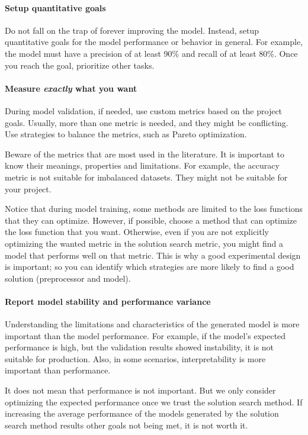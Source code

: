 \paragraph{Setup quantitative goals}

Do not fall on the trap of forever improving the model. Instead, setup quantitative goals
for the model performance or behavior in general.  For example, the model must have a
precision of at least 90\% and recall of at least 80\%.  Once you reach the goal,
prioritize other tasks.

\paragraph{Measure \emph{exactly} what you want}

During model validation, if needed, use custom metrics based on the project goals.
Usually, more than one metric is needed, and they might be conflicting.  Use strategies to
balance the metrics, such as Pareto optimization.

Beware of the metrics that are most used in the literature.  It is important to know their
meanings, properties and limitations.  For example, the accuracy metric is not suitable
for imbalanced datasets.  They might not be suitable for your project.

Notice that during model training, some methods are limited to the loss functions that
they can optimize.  However, if possible, choose a method that can optimize the loss
function that you want.  Otherwise, even if you are not explicitly optimizing the wanted
metric in the solution search metric, you might find a model that performs well on that
metric.  This is why a good experimental design is important; so you can identify which
strategies are more likely to find a good solution (preprocessor and model).

\paragraph{Report model stability and performance variance}

Understanding the limitations and characteristics of the generated model is more important
than the model performance.  For example, if the model's expected performance is high, but
the validation results showed instability, it is not suitable for production.  Also, in
some scenarios, interpretability is more important than performance.

It does not mean that performance is not important.  But we only consider optimizing the
expected performance once we trust the solution search method.  If increasing the average
performance of the models generated by the solution search method results other goals not
being met, it is not worth it.

